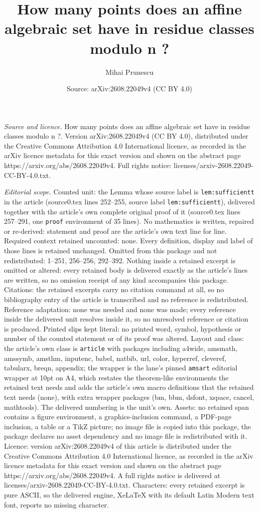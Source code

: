 \documentclass[10pt,a4paper]{amsart}
\title[How many points does an affine algebraic set have in residue]{How many points does an affine algebraic set have in residue classes modulo n ?}
\author{Mihai Prunescu}
\date{Source: arXiv:2608.22049v4 (CC BY 4.0)}
\begin{document}
\maketitle

\noindent\emph{Source and licence.} How many points does an affine algebraic set have in residue classes modulo n ?. Version arXiv:2608.22049v4 (CC BY 4.0), distributed under the Creative Commons Attribution 4.0 International licence, as recorded in the arXiv licence metadata for this exact version and shown on the abstract page https://arxiv.org/abs/2608.22049v4. Full rights notice: licenses/arxiv-2608.22049-CC-BY-4.0.txt.\par\smallskip

\noindent\textit{Editorial scope.} Counted unit: the Lemma whose source label is \texttt{lem:sufficientt} in the article (source0.tex lines 252--255, source label \texttt{lem:sufficientt}), delivered together with the article's own complete original proof of it (source0.tex lines 257--291, one \texttt{proof} environment of 35 lines). No mathematics is written, repaired or re-derived: statement and proof are the article's own text line for line. Required context retained uncounted: none. Every definition, display and label of those lines is retained unchanged. Omitted from this package and not redistributed: 1--251, 256--256, 292--392. Nothing inside a retained excerpt is omitted or altered: every retained body is delivered exactly as the article's lines are written, so no omission receipt of any kind accompanies this package. Citations: the retained excerpts carry no citation command at all, so no bibliography entry of the article is transcribed and no reference is redistributed. Reference adaptation: none was needed and none was made; every reference inside the delivered unit resolves inside it, so no unresolved reference or citation is produced. Printed slips kept literal: no printed word, symbol, hypothesis or number of the counted statement or of its proof was altered. Layout and class: the article's own class is \texttt{article} with packages including a4wide, amsmath, amssymb, amsthm, inputenc, babel, natbib, url, color, hyperref, cleveref, tabularx, breqn, appendix; the wrapper is the lane's pinned \texttt{amsart} editorial wrapper at 10pt on A4, which restates the theorem-like environments the retained text needs and adds the article's own macro definitions that the retained text needs (none), with extra wrapper packages (bm, bbm, dsfont, xspace, cancel, mathtools). The delivered numbering is the unit's own. Assets: no retained span contains a figure environment, a graphics-inclusion command, a PDF-page inclusion, a table or a TikZ picture; no image file is copied into this package, the package declares no asset dependency and no image file is redistributed with it. Licence: version arXiv:2608.22049v4 of this article is distributed under the Creative Commons Attribution 4.0 International licence, as recorded in the arXiv licence metadata for this exact version and shown on the abstract page https://arxiv.org/abs/2608.22049v4. A full rights notice is delivered at licenses/arxiv-2608.22049-CC-BY-4.0.txt. Characters: every retained excerpt is pure ASCII, so the delivered engine, XeLaTeX with its default Latin Modern text font, reports no missing character.
\end{document}
